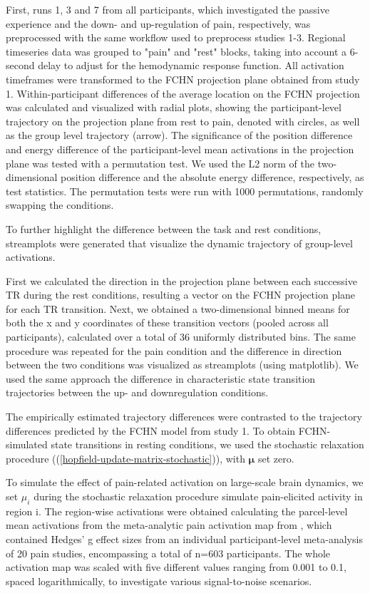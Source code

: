 \documentclass{article}
\begin{document}
First, runs 1, 3 and 7 from all participants, which investigated the passive experience and the down- and up-regulation of pain, respectively, was preprocessed with the same workflow used to preprocess studies 1-3. Regional timeseries data was grouped to "pain" and "rest" blocks, taking into account a 6-second delay to adjust for the hemodynamic response function. All activation timeframes were transformed to the FCHN projection plane obtained from study 1. Within-participant differences of the average location on the FCHN projection was calculated and visualized with radial plots, showing the participant-level trajectory on the projection plane from rest to pain, denoted with circles, as well as the group level trajectory (arrow). The significance of the position difference and energy difference of the participant-level mean activations in the projection plane was tested with a permutation test. We used the L2 norm of the two-dimensional position difference and the absolute energy difference, respectively, as test statistics. The permutation tests were run with 1000 permutations, randomly swapping the conditions.

To further highlight the difference between the task and rest conditions, streamplots were generated that visualize the dynamic trajectory of group-level activations.

First we calculated the direction in the projection plane between each successive TR during the rest conditions, resulting a vector on the FCHN projection plane for each TR transition.
Next, we obtained a two-dimensional binned means for both the x and y coordinates of these transition vectors (pooled across all participants), calculated over a total of 36 uniformly distributed bins.
The same procedure was repeated for the pain condition and the difference in direction between the two conditions was visualized as streamplots (using matplotlib).
We used the same approach the difference in characteristic state transition trajectories between the up- and downregulation conditions.

The empirically estimated trajectory differences were contrasted to the trajectory differences predicted by the FCHN model from study 1.
To obtain FCHN-simulated state transitions in resting conditions, we used the stochastic relaxation procedure ((\ref{hopfield-update-matrix-stochastic})), with $\mathbf{\mu}$ set zero.

To simulate the effect of pain-related activation on large-scale brain dynamics, we set $\mu_i$ during the stochastic relaxation procedure simulate pain-elicited activity in region i. The region-wise activations were obtained calculating the parcel-level mean activations from the meta-analytic pain activation map from \citep{zunhammer2021meta}, which contained Hedges' g effect sizes from an individual participant-level meta-analysis of 20 pain studies, encompassing a total of n=603 participants. The whole activation map was scaled with five different values ranging from 0.001 to 0.1, spaced logarithmically, to investigate various signal-to-noise scenarios.
\end{document}
